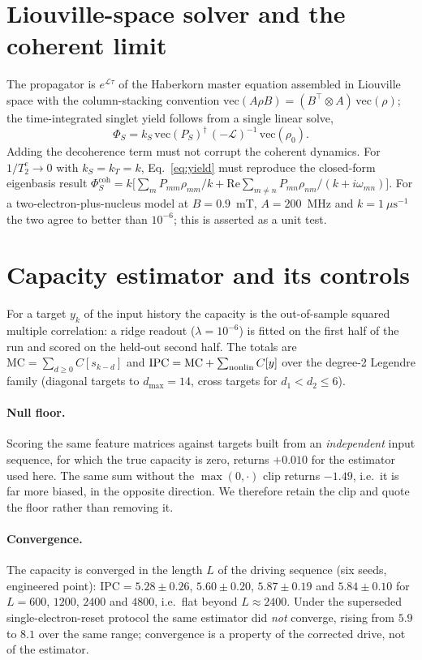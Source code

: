\documentclass[aps,prx,reprint,superscriptaddress,nofootinbib,floatfix]{revtex4-2}
\begin{document}
\section{Liouville-space solver and the coherent limit}
\label{sec:solver}
The propagator is $e^{\mathcal{L}\tau}$ of the Haberkorn master equation assembled in
Liouville space with the column-stacking convention
$\mathrm{vec}(A\rho B)=(B^{\!\top}\!\otimes A)\,\mathrm{vec}(\rho)$; the
time-integrated singlet yield follows from a single linear solve,
\begin{equation}
\Phi_S = k_S\,\mathrm{vec}(P_S)^{\dagger}\,(-\mathcal{L})^{-1}\,\mathrm{vec}(\rho_0).
\label{eq:yield}
\end{equation}
Adding the decoherence term must not corrupt the coherent dynamics. For
$1/T_2^e\to0$ with $k_S=k_T=k$, Eq.~\eqref{eq:yield} must reproduce the closed-form
eigenbasis result
$\Phi_S^{\mathrm{coh}}=k\big[\sum_m P_{mm}\rho_{mm}/k+\mathrm{Re}\sum_{m\neq n}
P_{mn}\rho_{nm}/(k+i\omega_{mn})\big]$. For a two-electron-plus-nucleus model at
$B=0.9$~mT, $A=200$~MHz and $k=1~\mu\mathrm{s}^{-1}$ the two agree to better than
$10^{-6}$; this is asserted as a unit test.

\section{Capacity estimator and its controls}
\label{sec:capacity}
For a target $y_k$ of the input history the capacity is the out-of-sample squared
multiple correlation: a ridge readout ($\lambda=10^{-6}$) is fitted on the first half
of the run and scored on the held-out second half. The totals are
$\mathrm{MC}=\sum_{d\ge0}C[s_{k-d}]$ and
$\mathrm{IPC}=\mathrm{MC}+\sum_{\rm nonlin}C[y]$ over the degree-2 Legendre family
(diagonal targets to $d_{\max}=14$, cross targets for $d_1<d_2\le6$).

\paragraph*{Null floor.} Scoring the same feature matrices against targets built from
an \emph{independent} input sequence, for which the true capacity is zero, returns
$+0.010$ for the estimator used here. The same sum without the $\max(0,\cdot)$ clip
returns $-1.49$, i.e.\ it is far more biased, in the opposite direction. We therefore
retain the clip and quote the floor rather than removing it.

\paragraph*{Convergence.} The capacity is converged in the length $L$ of the driving
sequence (six seeds, engineered point): $\mathrm{IPC}=5.28\pm0.26$, $5.60\pm0.20$,
$5.87\pm0.19$ and $5.84\pm0.10$ for $L=600$, $1200$, $2400$ and $4800$, i.e.\ flat
beyond $L\approx2400$. Under the superseded single-electron-reset protocol the same
estimator did \emph{not} converge, rising from $5.9$ to $8.1$ over the same range;
convergence is a property of the corrected drive, not of the estimator.
\end{document}
